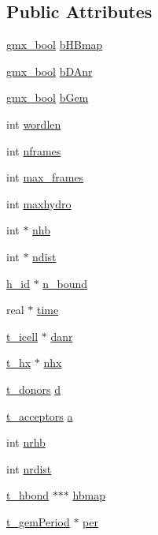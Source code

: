 \subsection*{\-Public \-Attributes}
\begin{DoxyCompactItemize}
\item 
\hyperlink{include_2types_2simple_8h_a8fddad319f226e856400d190198d5151}{gmx\-\_\-bool} \hyperlink{structt__hbdata_adcf6da78418a711692a5ca9729e2ec95}{b\-H\-Bmap}
\item 
\hyperlink{include_2types_2simple_8h_a8fddad319f226e856400d190198d5151}{gmx\-\_\-bool} \hyperlink{structt__hbdata_aa398cc2ec3032b8a51b9fcb546f5b0f5}{b\-D\-Anr}
\item 
\hyperlink{include_2types_2simple_8h_a8fddad319f226e856400d190198d5151}{gmx\-\_\-bool} \hyperlink{structt__hbdata_a4a2dc3a0ec0767a23cc739bb8f534290}{b\-Gem}
\item 
int \hyperlink{structt__hbdata_aeebe25bcfa29f95610bea3bf66c5ee77}{wordlen}
\item 
int \hyperlink{structt__hbdata_a1ab926aace594d53e1bb303b81aafb74}{nframes}
\item 
int \hyperlink{structt__hbdata_a782a9b67cf7a858f07725a4c9423ffe8}{max\-\_\-frames}
\item 
int \hyperlink{structt__hbdata_adce8f5289afb75b48308e5f7f2d951cd}{maxhydro}
\item 
int $\ast$ \hyperlink{structt__hbdata_a1772badaa2ba2efc303d43614245ec23}{nhb}
\item 
int $\ast$ \hyperlink{structt__hbdata_a1e63478c438ced255aaed001e1dbdbfb}{ndist}
\item 
\hyperlink{gmx__hbond_8c_ab9da24ffcda463c10b557ea7eaf8ee7f}{h\-\_\-id} $\ast$ \hyperlink{structt__hbdata_a52bb6679bb2e8601e7a84d2a28b213ce}{n\-\_\-bound}
\item 
real $\ast$ \hyperlink{structt__hbdata_a137817716d88606ddef69932da506496}{time}
\item 
\hyperlink{gmx__hbond_8c_a2636f964595b9dc2a2798f14237b8db5}{t\-\_\-icell} $\ast$ \hyperlink{structt__hbdata_a2adf5668789a3b8bfac2a65b7c19bc33}{danr}
\item 
\hyperlink{gmx__hbond_8c_a2939774e311e2cb5673a3050028a9106}{t\-\_\-hx} $\ast$ \hyperlink{structt__hbdata_ad214d4eba568bf4d9802cd54513d7df9}{nhx}
\item 
\hyperlink{structt__donors}{t\-\_\-donors} \hyperlink{structt__hbdata_a96a5dd0c3c48edff83744e27366eab5a}{d}
\item 
\hyperlink{structt__acceptors}{t\-\_\-acceptors} \hyperlink{structt__hbdata_ae8446218dec0d6ed71a691ba485547fb}{a}
\item 
int \hyperlink{structt__hbdata_abf8a32a4934da2697a2ffbcebc6fc23d}{nrhb}
\item 
int \hyperlink{structt__hbdata_a2383bb0e462f565c595f9439fd75e42d}{nrdist}
\item 
\hyperlink{structt__hbond}{t\-\_\-hbond} $\ast$$\ast$$\ast$ \hyperlink{structt__hbdata_ab47d3c67d228e61e188e653e66abf7a9}{hbmap}
\item 
\hyperlink{structt__gemPeriod}{t\-\_\-gem\-Period} $\ast$ \hyperlink{structt__hbdata_a8c9898d1cb0e63efc4b5781f1e9e3bb4}{per}
\end{DoxyCompactItemize}


